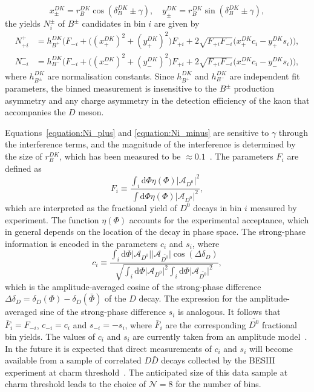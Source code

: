 \documentclass[12pt, a4paper, notitlepage, onecolumn]{article}
\newcommand*{\diff}{\mathrm{d}}
\begin{document}
\begin{equation}
    x_\pm^{DK} = r_B^{DK}\cos(\delta_B^{DK}\pm\gamma), \quad y_\pm^{DK} = r_B^{DK}\sin(\delta_B^{DK}\pm\gamma),
    \label{equation:CP_observables}
\end{equation}
the yields $N_i^\pm$ of $B^\pm$ candidates in bin $i$ are given by 
\begin{align}
    N_{+i}^+ &= h_{B^+}^{DK}\Big(F_{-i} + \big((x_+^{DK})^2 + (y_+^{DK})^2\big)F_{+i} + 2\sqrt{F_{+i}F_{-i}}\big(x_+^{DK}c_i - y_+^{DK}s_i\big)\Big), \label{equation:Ni_plus} \\
    N_{-i}^- &= h_{B^-}^{DK}\Big(F_{-i} + \big((x_-^{DK})^2 + (y_-^{DK})^2\big)F_{+i} + 2\sqrt{F_{+i}F_{-i}}\big(x_-^{DK}c_i - y_-^{DK}s_i\big)\Big), \label{equation:Ni_minus}
\end{align}
where $h_{B^\pm}^{DK}$ are normalisation constants. Since $h_{B^+}^{DK}$ and $h_{B^-}^{DK}$ are independent fit parameters, the binned measurement is insensitive to the $B^\pm$ production asymmetry and any charge asymmetry in the detection efficiency of the kaon that accompanies the $D$ meson.

Equations~\eqref{equation:Ni_plus} and \eqref{equation:Ni_minus} are sensitive to $\gamma$ through the interference terms, and the magnitude of the interference is determined by the size of $r_B^{DK}$, which has been measured to be $\approx 0.1$~\cite{LHCb-PAPER-2021-033}. The parameters $F_i$ are defined as
\begin{equation}
    F_i\equiv\frac{\int_i\diff\Phi\eta(\Phi)\lvert\mathcal{A}_{D^0}\rvert^2}{\int\diff\Phi\eta(\Phi)\lvert\mathcal{A}_{D^0}\rvert^2},
    \label{equation:Fi}
\end{equation}
which are interpreted as the fractional yield of $D^0$ decays in bin $i$ measured by experiment. The function $\eta(\Phi)$ accounts for the experimental acceptance, which in general depends on the location of the decay in phase space. The strong-phase information is encoded in the parameters $c_i$ and $s_i$, where 
\begin{equation}
    c_i\equiv\frac{\int_i\diff\Phi\lvert\mathcal{A}_{D^0}\rvert\lvert\mathcal{A}_{\bar{D^0}}\rvert\cos(\Delta\delta_D)}{\sqrt{\int_i\diff\Phi\lvert\mathcal{A}_{D^0}\rvert^2\int_i\diff\Phi\lvert\mathcal{A}_{\bar{D^0}}\rvert^2}},
    \label{equation:ci}
\end{equation}
which is the amplitude-averaged cosine of the strong-phase difference $\Delta\delta_D = \delta_D(\Phi) - \delta_D(\bar{\Phi})$ of the $D$ decay. The expression for the amplitude-averaged sine of the strong-phase difference $s_i$ is analogous. It follows that $\bar{F}_i = F_{-i}$, $c_{-i} = c_i$ and $s_{-i} = -s_i$, where $\bar{F}_i$ are the corresponding $\bar{D^0}$ fractional bin yields.  The values of $c_i$ and $s_i$ are currently taken from an amplitude model~\cite{LHCb-PAPER-2018-041}. In the future it is expected that direct measurements of $c_i$ and $s_i$ will become available from a sample of correlated $D\bar{D}$ decays collected by the BESIII experiment at charm threshold~\cite{cite:BESIIIWhitePaper}. The anticipated size of this data sample at charm threshold leads to the choice of $\mathcal{N} = 8$ for the number of bins.
\end{document}
